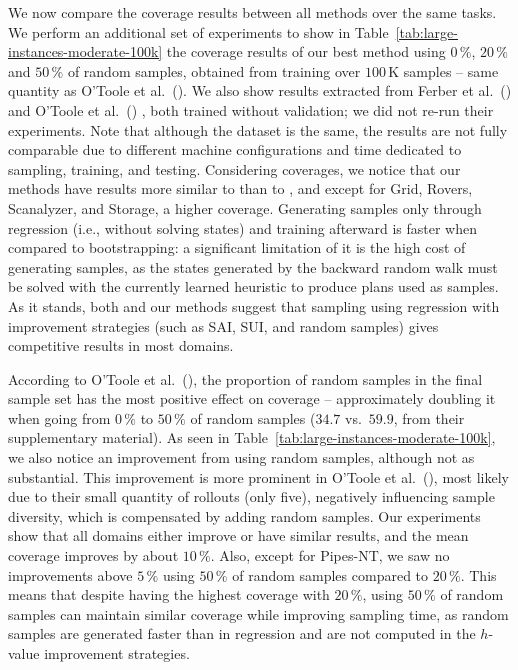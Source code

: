 We now compare the coverage results between all methods over the same tasks. We perform an additional set of experiments to show in Table~\ref{tab:large-instances-moderate-100k} the coverage results of our best method using $0\,\%$, $20\,\%$ and $50\,\%$ of random samples, obtained from training over $100$\,K samples -- same quantity as O'Toole et al.~(\citeyear{OToole/2022}). We also show results extracted from Ferber et al.~(\citeyear{Ferber.etal/2022}) \hboot and O'Toole et al.~(\citeyear{OToole/2022}) \hnrsl, both trained without validation; we did not re-run their experiments. Note that although the dataset is the same, the results are not fully comparable due to different machine configurations and time dedicated to sampling, training, and testing. Considering coverages, we notice that our methods have results more similar to \hnrsl than to \hboot, and except for Grid, Rovers, Scanalyzer, and Storage, a higher coverage. Generating samples only through regression (i.e., without solving states) and training afterward is faster when compared to bootstrapping: a significant limitation of it is the high cost of generating samples, as the states generated by the backward random walk must be solved with the currently learned heuristic to produce plans used as samples. As it stands, both \hnrsl and our methods suggest that sampling using regression with improvement strategies (such as SAI, SUI, and random samples) gives competitive results in most domains.



According to O'Toole et al.~(\citeyear{OToole/2022}), the proportion of random samples in the final sample set has the most positive effect on coverage -- approximately doubling it when going from $0\,\%$ to $50\,\%$ of random samples ($34.7$ vs.~$59.9$, from their supplementary material). As seen in Table~\ref{tab:large-instances-moderate-100k}, we also notice an improvement from using random samples, although not as substantial. This improvement is more prominent in O'Toole et al.~(\citeyear{OToole/2022}), most likely due to their small quantity of rollouts (only five), negatively influencing sample diversity, which is compensated by adding random samples. Our experiments show that all domains either improve or have similar results, and the mean coverage improves by about $10\,\%$. Also, except for Pipes-NT, we saw no improvements above $5\,\%$ using $50\,\%$ of random samples compared to $20\,\%$. This means that despite having the highest coverage with $20\,\%$, using $50\,\%$ of random samples can maintain similar coverage while improving sampling time, as random samples are generated faster than in regression and are not computed in the $h$-value improvement strategies.
